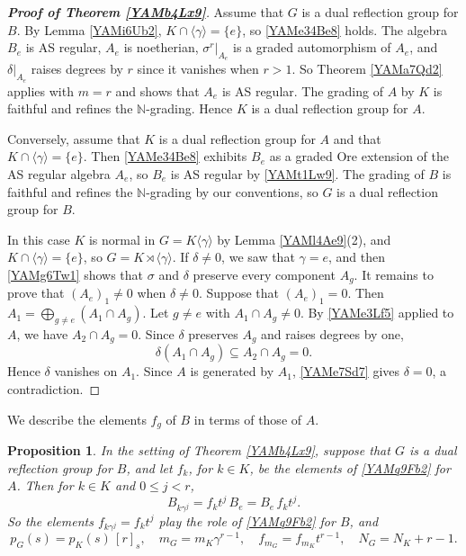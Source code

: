\documentclass[reqno]{amsart}
\numberwithin{equation}{section}
\newtheorem{proposition}[equation]{Proposition}
\theoremstyle{definition}
\theoremstyle{remark}
\theoremstyle{plain}
\begin{document}
\begin{proof}[\textnormal{\bfseries Proof of Theorem \ref{YAMb4Lx9}}]
Assume that $G$ is a dual reflection group for $B$. By Lemma \ref{YAMi6Ub2}, $K\cap\langle\gamma\rangle=\{e\}$, so \eqref{YAMe34Be8} holds. The algebra $B_e$ is AS regular, $A_e$ is noetherian, $\sigma^r|_{A_e}$ is a graded automorphism of $A_e$, and $\delta|_{A_e}$ raises degrees by $r$ since it vanishes when $r>1$. So Theorem \ref{YAMa7Qd2} applies with $m=r$ and shows that $A_e$ is AS regular. The grading of $A$ by $K$ is faithful and refines the $\mathbb N$-grading. Hence $K$ is a dual reflection group for $A$.

Conversely, assume that $K$ is a dual reflection group for $A$ and that $K\cap\langle\gamma\rangle=\{e\}$. Then \eqref{YAMe34Be8} exhibits $B_e$ as a graded Ore extension of the AS regular algebra $A_e$, so $B_e$ is AS regular by \eqref{YAMt1Lw9}. The grading of $B$ is faithful and refines the $\mathbb N$-grading by our conventions, so $G$ is a dual reflection group for $B$.

In this case $K$ is normal in $G=K\langle\gamma\rangle$ by Lemma \ref{YAMl4Ae9}(2), and $K\cap\langle\gamma\rangle=\{e\}$, so $G=K\rtimes\langle\gamma\rangle$. If $\delta\neq0$, we saw that $\gamma=e$, and then \eqref{YAMg6Tw1} shows that $\sigma$ and $\delta$ preserve every component $A_g$. It remains to prove that $(A_e)_1\neq0$ when $\delta\neq0$. Suppose that $(A_e)_1=0$. Then $A_1=\bigoplus_{g\neq e}(A_1\cap A_g)$. Let $g\neq e$ with $A_1\cap A_g\neq0$. By \eqref{YAMe3Lf5} applied to $A$, we have $A_2\cap A_g=0$. Since $\delta$ preserves $A_g$ and raises degrees by one,
\[
\delta(A_1\cap A_g)\subseteq A_2\cap A_g=0.
\]
Hence $\delta$ vanishes on $A_1$. Since $A$ is generated by $A_1$, \eqref{YAMe7Sd7} gives $\delta=0$, a contradiction.
\end{proof}

We describe the elements $f_g$ of $B$ in terms of those of $A$.

\begin{proposition}\label{YAMn5Fh3}
In the setting of Theorem \ref{YAMb4Lx9}, suppose that $G$ is a dual reflection group for $B$, and let $f_k$, for $k\in K$, be the elements of \eqref{YAMq9Fb2} for $A$. Then for $k\in K$ and $0\le j<r$,
\begin{equation}\label{YAMe35Fg9}
B_{k\gamma^j}=f_kt^j\,B_e=B_e\,f_kt^j.
\end{equation}
So the elements $f_{k\gamma^j}=f_kt^j$ play the role of \eqref{YAMq9Fb2} for $B$, and
\begin{equation}\label{YAMe45Pg1}
p_G(s)=p_K(s)\,[r]_s,\quad m_G=m_K\gamma^{r-1},\quad f_{m_G}=f_{m_K}t^{r-1},\quad N_G=N_K+r-1.
\end{equation}
\end{proposition}
\end{document}
